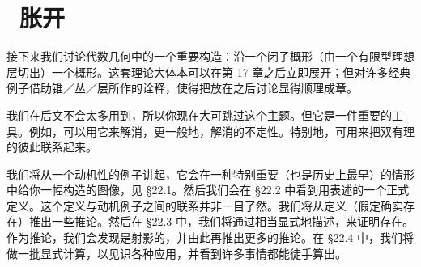 
\chapter{\hard\ 胀开}
\label{ch:blowing-up}

接下来我们讨论代数几何中的一个重要构造：沿一个闭子概形（由一个有限型理想层切出）\trBlowup{}一个概形。这套理论大体本可以在第 17 章之后立即展开；但对许多经典例子借助\trConormal{}锥／\trConormal{}丛／\trConormal{}层所作的诠释，使得把\trBlowup{}放在\trDifferential{}之后讨论显得顺理成章。

我们在后文不会太多用到\trBlowup，所以你现在大可跳过这个主题。但它是一件重要的工具。例如，可以用它来解消\trSingularPoint，更一般地，解消\trRationalMap{}的不定性。特别地，\trBlowup{}可用来把双有理的\trVariety{}彼此联系起来。

我们将从一个动机性的例子讲起，它会在一种特别重要（也是历史上最早）的情形中给你一幅构造的图像，见 \S22.1。然后我们会在 \S22.2 中看到用\trUniversalProperty{}表述的一个正式定义。这个定义与动机例子之间的联系并非一目了然。我们将从定义（假定\trBlowup{}确实存在）推出一些推论。然后在 \S22.3 中，我们将通过相当显式地描述\trBlowup，来证明\trBlowup{}存在。作为推论，我们会发现\trBlowup\trMorphism{}是射影的，并由此再推出更多的推论。在 \S22.4 中，我们将做一批显式计算，以见识各种应用，并看到许多事情都能徒手算出。





